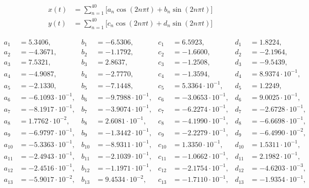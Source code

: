 \begin{align*}
x(t) &= \sum\limits_{n=1}^{ 40 } \Big[a_n \cos(2n\pi t) + b_n \sin(2n\pi t) \Big]\\ 
y(t) &= \sum\limits_{n=1}^{ 40 } \Big[c_n \cos(2n\pi t) + d_n \sin(2n\pi t) \Big]
\end{align*}

\begin{align*}
  a_{ 1 } &= 5.3406, & b_{ 1 } &= -6.5306, & c_{ 1 } &= 6.5923, & d_{ 1 } &= 1.8224, \\ 
  a_{ 2 } &= -4.3671, & b_{ 2 } &= -1.1792, & c_{ 2 } &= -1.6600, & d_{ 2 } &= -2.1964, \\ 
  a_{ 3 } &= 7.5321, & b_{ 3 } &= 2.8637, & c_{ 3 } &= -1.2508, & d_{ 3 } &= -9.5439, \\ 
  a_{ 4 } &= -4.9087, & b_{ 4 } &= -2.7770, & c_{ 4 } &= -1.3594, & d_{ 4 } &= 8.9374 \cdot 10^{ -1 }, \\ 
  a_{ 5 } &= -2.1330, & b_{ 5 } &= -7.1448, & c_{ 5 } &= 5.3364 \cdot 10^{ -1 }, & d_{ 5 } &= 1.2249, \\ 
  a_{ 6 } &= -6.1093 \cdot 10^{ -1 }, & b_{ 6 } &= -9.7988 \cdot 10^{ -1 }, & c_{ 6 } &= -3.0653 \cdot 10^{ -1 }, & d_{ 6 } &= 9.0025 \cdot 10^{ -1 }, \\ 
  a_{ 7 } &= -8.1917 \cdot 10^{ -1 }, & b_{ 7 } &= -3.9074 \cdot 10^{ -1 }, & c_{ 7 } &= -6.2274 \cdot 10^{ -1 }, & d_{ 7 } &= -2.6728 \cdot 10^{ -1 }, \\ 
  a_{ 8 } &= 1.7762 \cdot 10^{ -2 }, & b_{ 8 } &= 2.6081 \cdot 10^{ -1 }, & c_{ 8 } &= -4.1990 \cdot 10^{ -1 }, & d_{ 8 } &= -6.6698 \cdot 10^{ -1 }, \\ 
  a_{ 9 } &= -6.9797 \cdot 10^{ -1 }, & b_{ 9 } &= -1.3442 \cdot 10^{ -1 }, & c_{ 9 } &= -2.2279 \cdot 10^{ -1 }, & d_{ 9 } &= -6.4990 \cdot 10^{ -2 }, \\ 
  a_{ 10 } &= -5.3363 \cdot 10^{ -1 }, & b_{ 10 } &= -8.9311 \cdot 10^{ -1 }, & c_{ 10 } &= 1.3350 \cdot 10^{ -1 }, & d_{ 10 } &= 1.5311 \cdot 10^{ -1 }, \\ 
  a_{ 11 } &= -2.4943 \cdot 10^{ -1 }, & b_{ 11 } &= -2.1039 \cdot 10^{ -1 }, & c_{ 11 } &= -1.0662 \cdot 10^{ -1 }, & d_{ 11 } &= 2.1982 \cdot 10^{ -1 }, \\ 
  a_{ 12 } &= -2.4516 \cdot 10^{ -1 }, & b_{ 12 } &= -1.1971 \cdot 10^{ -1 }, & c_{ 12 } &= -2.1754 \cdot 10^{ -1 }, & d_{ 12 } &= -4.6203 \cdot 10^{ -3 }, \\ 
  a_{ 13 } &= -5.9017 \cdot 10^{ -2 }, & b_{ 13 } &= 9.4534 \cdot 10^{ -2 }, & c_{ 13 } &= -1.7110 \cdot 10^{ -1 }, & d_{ 13 } &= -1.9354 \cdot 10^{ -1 }, \\ 

\end{align*}
